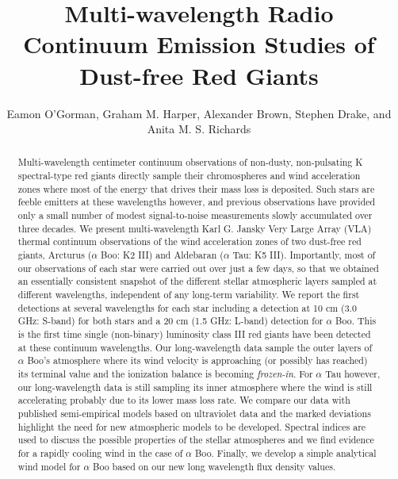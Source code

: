 \documentclass[iop]{emulateapj}
\begin{document}
\title{Multi-wavelength Radio Continuum Emission Studies of Dust-free Red Giants}


\author{Eamon O'Gorman, Graham M. Harper, Alexander Brown, Stephen Drake, and Anita M. S. Richards}



\begin{abstract}

Multi-wavelength centimeter continuum observations of non-dusty, non-pulsating K spectral-type red giants directly sample their chromospheres and wind acceleration zones where most of the energy that drives their mass loss is deposited. Such stars are feeble emitters at these wavelengths however, and previous observations have provided only a small number of modest signal-to-noise measurements slowly accumulated over three decades. We present multi-wavelength Karl G. Jansky Very Large Array (VLA) thermal continuum observations of the wind acceleration zones of two dust-free red giants, Arcturus ($\alpha$ Boo: K2 III) and Aldebaran ($\alpha$ Tau: K5 III). Importantly, most of our observations of each star were carried out over just a few days, so that we obtained an essentially consistent snapshot of the different stellar atmospheric layers sampled at different wavelengths, independent of any long-term variability. We report the first detections at several wavelengths for each star including a detection at 10 cm (3.0 GHz: S-band) for both stars and a 20 cm (1.5 GHz: L-band) detection for $\alpha$ Boo. This is the first time single (non-binary) luminosity class III red giants have been detected at these continuum wavelengths. Our long-wavelength data sample the outer layers of $\alpha$ Boo's atmosphere where its wind velocity is approaching (or possibly has reached) its terminal value and the ionization balance is becoming \textit{frozen-in}. For $\alpha$ Tau however, our long-wavelength data is still sampling its inner atmosphere where the wind is still accelerating probably due to its lower mass loss rate. We compare our data with published semi-empirical models based on ultraviolet data and the marked deviations highlight the need for new atmospheric models to be developed. Spectral indices are used to discuss the possible properties of the stellar atmospheres and we find evidence for a rapidly cooling wind in the case of $\alpha$ Boo. Finally, we develop a simple analytical wind model for $\alpha$ Boo based on our new long wavelength flux density values.

\end{abstract}
\end{document}
